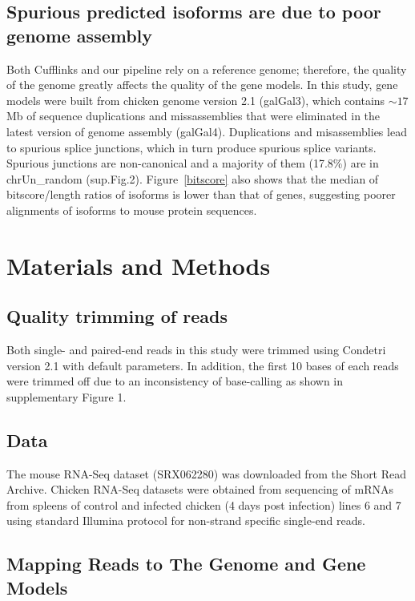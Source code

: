 \documentclass[10pt]{article}
\begin{document}
\subsection*{Spurious predicted isoforms are due to poor genome assembly}
Both Cufflinks and our pipeline rely on a reference genome; therefore, the
quality of the genome greatly affects the quality of the gene models.  In this
study, gene models were built from chicken genome version 2.1 (galGal3), which
contains $\sim17$ Mb of sequence duplications and missassemblies that were
eliminated in the latest version of genome assembly (galGal4).  Duplications
and misassemblies lead to spurious splice junctions, which in turn produce
spurious splice variants. Spurious junctions are non-canonical and a majority
of them (17.8\%) are in chrUn\_random (sup.Fig.2). Figure~\ref{bitscore} also
shows that the median of bitscore/length ratios of isoforms is lower than that
of genes, suggesting poorer alignments of isoforms to mouse protein sequences.

\section*{Materials and Methods}

\subsection*{Quality trimming of reads}
Both single- and paired-end reads in this study were trimmed using Condetri
version 2.1 with default parameters.  In addition, the first 10 bases of each
reads were trimmed off due to an inconsistency of base-calling as shown in
supplementary Figure 1.

\subsection*{Data}

The mouse RNA-Seq dataset (SRX062280) was downloaded from the Short Read
Archive.  Chicken RNA-Seq datasets were obtained from sequencing of mRNAs from
spleens of control and infected chicken (4 days post infection) lines 6 and 7
using standard Illumina protocol for non-strand specific single-end reads.

\subsection*{Mapping Reads to The Genome and Gene Models}
\end{document}
